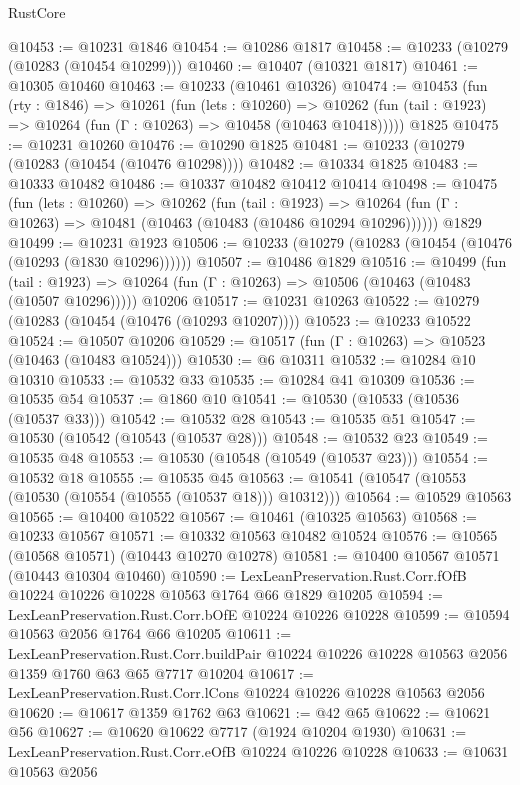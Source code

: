 \begin{lexlean}{RustCore}
\begin{coremodule}
@10453 := @10231 @1846
@10454 := @10286 @1817
@10458 := @10233 (@10279 (@10283 (@10454 @10299)))
@10460 := @10407 (@10321 @1817)
@10461 := @10305 @10460
@10463 := @10233 (@10461 @10326)
@10474 := @10453
    (fun (rty : @1846) =>
    @10261
      (fun (lets : @10260) =>
      @10262 (fun (tail : @1923) => @10264 (fun (Γ : @10263) => @10458 (@10463 @10418)))))
    @1825
@10475 := @10231 @10260
@10476 := @10290 @1825
@10481 := @10233 (@10279 (@10283 (@10454 (@10476 @10298))))
@10482 := @10334 @1825
@10483 := @10333 @10482
@10486 := @10337 @10482 @10412 @10414
@10498 := @10475
    (fun (lets : @10260) =>
    @10262
      (fun (tail : @1923) =>
      @10264 (fun (Γ : @10263) => @10481 (@10463 (@10483 (@10486 @10294 @10296))))))
    @1829
@10499 := @10231 @1923
@10506 := @10233 (@10279 (@10283 (@10454 (@10476 (@10293 (@1830 @10296))))))
@10507 := @10486 @1829
@10516 := @10499
    (fun (tail : @1923) => @10264 (fun (Γ : @10263) => @10506 (@10463 (@10483 (@10507 @10296)))))
    @10206
@10517 := @10231 @10263
@10522 := @10279 (@10283 (@10454 (@10476 (@10293 @10207))))
@10523 := @10233 @10522
@10524 := @10507 @10206
@10529 := @10517 (fun (Γ : @10263) => @10523 (@10463 (@10483 @10524)))
@10530 := @6 @10311
@10532 := @10284 @10 @10310
@10533 := @10532 @33
@10535 := @10284 @41 @10309
@10536 := @10535 @54
@10537 := @1860 @10
@10541 := @10530 (@10533 (@10536 (@10537 @33)))
@10542 := @10532 @28
@10543 := @10535 @51
@10547 := @10530 (@10542 (@10543 (@10537 @28)))
@10548 := @10532 @23
@10549 := @10535 @48
@10553 := @10530 (@10548 (@10549 (@10537 @23)))
@10554 := @10532 @18
@10555 := @10535 @45
@10563 := @10541 (@10547 (@10553 (@10530 (@10554 (@10555 (@10537 @18))) @10312)))
@10564 := @10529 @10563
@10565 := @10400 @10522
@10567 := @10461 (@10325 @10563)
@10568 := @10233 @10567
@10571 := @10332 @10563 @10482 @10524
@10576 := @10565 (@10568 @10571) (@10443 @10270 @10278)
@10581 := @10400 @10567 @10571 (@10443 @10304 @10460)
@10590 := LexLeanPreservation.Rust.Corr.fOfB @10224 @10226 @10228 @10563 @1764 @66 @1829 @10205
@10594 := LexLeanPreservation.Rust.Corr.bOfE @10224 @10226 @10228
@10599 := @10594 @10563 @2056 @1764 @66 @10205
@10611 := LexLeanPreservation.Rust.Corr.buildPair
    @10224
    @10226
    @10228
    @10563
    @2056
    @1359
    @1760
    @63
    @65
    @7717
    @10204
@10617 := LexLeanPreservation.Rust.Corr.lCons @10224 @10226 @10228 @10563 @2056
@10620 := @10617 @1359 @1762 @63
@10621 := @42 @65
@10622 := @10621 @56
@10627 := @10620 @10622 @7717 (@1924 @10204 @1930)
@10631 := LexLeanPreservation.Rust.Corr.eOfB @10224 @10226 @10228
@10633 := @10631 @10563 @2056

\end{coremodule}
\end{lexlean}
